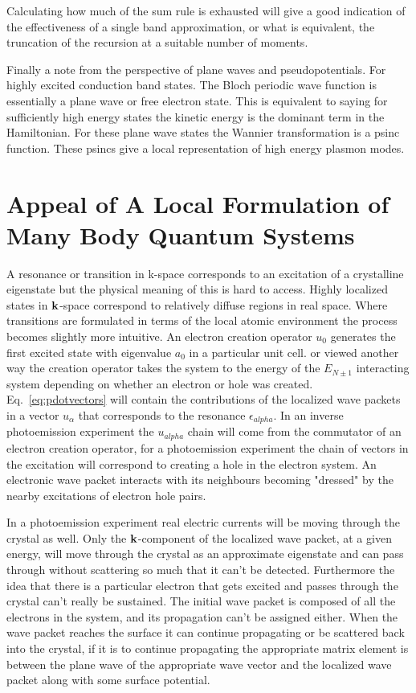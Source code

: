 \documentclass{article}
\def\k{{\bf k}}
\begin{document}
Calculating how much of the sum rule is exhausted will give a good indication
of the effectiveness of a single band approximation, or what is equivalent,
the truncation of the recursion at a suitable number of moments.

Finally a note from the perspective of plane waves and pseudopotentials. For
highly excited conduction band states. The Bloch periodic wave function is
essentially a plane wave or free electron state. This is equivalent to saying for
sufficiently high energy states the kinetic energy is the dominant term in the Hamiltonian.
For these plane wave states the Wannier transformation is a psinc function. These psincs
give a local representation of high energy plasmon modes.

\section{Appeal of A Local Formulation of Many Body Quantum Systems}
 A resonance or transition in k-space corresponds to an excitation 
of a crystalline eigenstate but the physical meaning of this is hard to access. Highly
localized states in $\k$-space correspond to relatively diffuse regions in real space. Where
transitions are formulated in terms of the local atomic environment the process becomes slightly
more intuitive. An electron creation operator $u_{0}$ generates the 
first excited state with eigenvalue $a_{0}$ in a particular unit cell. 
or viewed another way the creation operator takes the system to the energy 
of the $E_{N\pm1}$ interacting system depending on whether an electron or hole
was created. Eq.~\ref{eq:pdotvectors} will contain the contributions of the localized
wave packets in a vector $u_{\alpha}$ that corresponds to the resonance 
$\epsilon_{alpha}$. In an inverse photoemission experiment the $u_{alpha}$ chain
will come from the commutator of an electron creation operator, for a photoemission
experiment the chain of vectors in the excitation will correspond to creating a hole
in the electron system. An electronic wave packet interacts with its neighbours becoming
"dressed" by the nearby excitations of electron hole pairs. 

In a photoemission experiment real electric currents will be moving through the crystal as well.
Only the $\k$-component of the localized wave packet, at a given energy, will move through the crystal as 
an approximate eigenstate and can pass through without scattering so much that it can't be detected.
Furthermore the idea that there is a particular electron that gets excited and passes through the crystal
can't really be sustained. The initial wave packet is composed of all the electrons in the system, and its
propagation can't be assigned either. When the wave packet reaches the surface it can continue propagating
or be scattered back into the crystal, if it is to continue propagating the appropriate matrix element
is between the plane wave of the appropriate wave vector and the localized wave packet along with some
surface potential.
\end{document}
